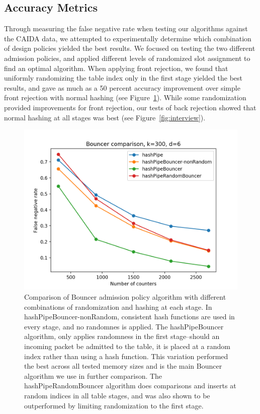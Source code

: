 \subsection{Accuracy Metrics}
Through measuring the false negative rate when testing our algorithms against the CAIDA data, we attempted to experimentally determine which combination of design policies yielded the best results. We focused on testing the two different admission policies, and applied different levels of randomized slot assignment to find an optimal algorithm. When applying front rejection, we found that uniformly randomizing the table index only in the first stage yielded the best results, and gave as much as a 50 percent accuracy improvement over simple front rejection with normal hashing (see Figure~\ref{fig:bouncer}). While some randomization provided improvements for front rejection, our tests of back rejection showed that normal hashing at all stages was best (see Figure~\ref{fig:interview}).
\begin{figure}[!htb]
  \centering
    \includegraphics[scale=0.5]{bouncer}
     \caption{Comparison of Bouncer admission policy algorithm with different combinations of randomization and hashing at each stage. In hashPipeBouncer-nonRandom, consistent hash functions are used in every stage, and no randomnes is applied. The hashPipeBouncer algorithm, only applies randomness in the first stage--should an incoming packet be admitted to the table, it is placed at a random index rather than using a hash function. This variation performed the best across all tested memory sizes and is the main Bouncer algorithm we use in further comparison. The hashPipeRandomBouncer algorithm does comparisons and inserts at random indices in all table stages, and was also shown to be outperformed by limiting randomization to the first stage.}
     \label{fig:bouncer}
\end{figure}
